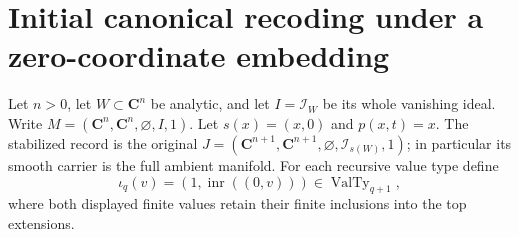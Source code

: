 \section{Initial canonical recoding under a zero-coordinate embedding}

\begin{definition}
\label{hir:disjoint-zero-coordinate-initial-record}
\leanok
Let $n>0$, let $W\subset\mathbf C^n$ be analytic, and let $I=\mathcal I_W$ be
its whole vanishing ideal. Write $M=(\mathbf C^n,\mathbf C^n,\varnothing,I,1)$.
Let $s(x)=(x,0)$ and $p(x,t)=x$. The stabilized record is the original
$J=(\mathbf C^{n+1},\mathbf C^{n+1},\varnothing,\mathcal I_{s(W)},1)$;
in particular its smooth carrier is the full ambient manifold.
For each recursive value type define
\[
 \iota_q(v)=(1,\operatorname{inr}((0,v)))\in\operatorname{ValTy}_{q+1},
\]
where both displayed finite values retain their finite inclusions into the
top extensions.
\end{definition}

